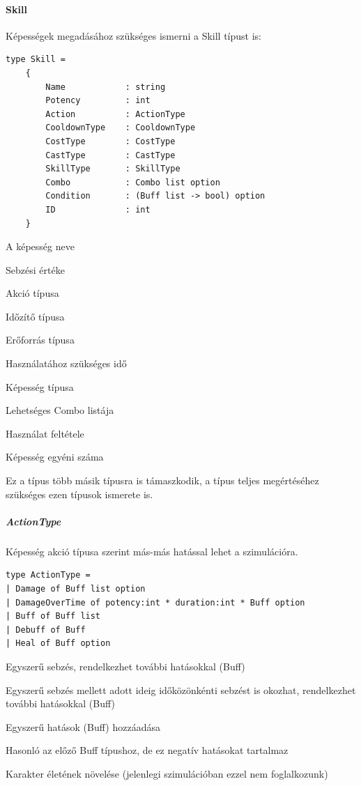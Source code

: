 \documentclass[12pt]{article}
\begin{document}
\paragraph{Skill} Képességek megadásához szükséges ismerni a Skill típust is:

\begin{lstlisting}
type Skill =
	{
		Name            : string
		Potency         : int
		Action          : ActionType
		CooldownType    : CooldownType
		CostType        : CostType
		CastType        : CastType
		SkillType       : SkillType
		Combo           : Combo list option
		Condition       : (Buff list -> bool) option
		ID              : int
	}
\end{lstlisting}

\begin{description}[align=left,labelwidth=2.5cm]
	\item [Name] A képesség neve
	\item [Potency] Sebzési értéke
	\item [Action] Akció típusa
	\item [CooldownType] Időzítő típusa
	\item [CostType] Erőforrás típusa
	\item [CastType] Használatához szükséges idő
	\item [SkillType] Képesség típusa
	\item [Combo] Lehetséges Combo listája
	\item [Condition] Használat feltétele
	\item [ID] Képesség egyéni száma
\end{description}

Ez a típus több másik típusra is támaszkodik, a típus teljes megértéséhez szükséges ezen típusok ismerete is.

\subparagraph{ActionType} 

Képesség akció típusa szerint más-más hatással lehet a szimulációra.

\begin{lstlisting}
type ActionType = 
| Damage of Buff list option
| DamageOverTime of potency:int * duration:int * Buff option
| Buff of Buff list
| Debuff of Buff
| Heal of Buff option
\end{lstlisting}

\begin{description}[align=left,labelwidth=2.5cm]
	\item [Damage] Egyszerű sebzés, rendelkezhet további hatásokkal (Buff)
	\item [DamageOverTime] Egyszerű sebzés mellett adott ideig időközönkénti sebzést is okozhat, rendelkezhet további hatásokkal (Buff)
	\item [Buff] Egyszerű hatások (Buff) hozzáadása
	\item [Debuff] Hasonló az előző Buff típushoz, de ez negatív hatásokat tartalmaz
	\item [Heal] Karakter életének növelése (jelenlegi szimulációban ezzel nem foglalkozunk)
\end{description}
\end{document}
